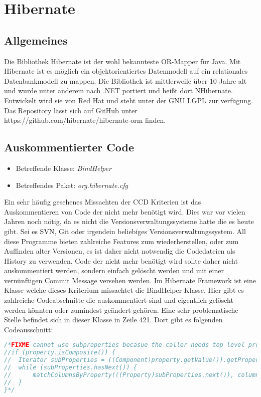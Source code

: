 
\section{Hibernate}
\subsection{Allgemeines}
Die Bibliothek Hibernate ist der wohl bekannteste OR-Mapper für Java. Mit Hibernate ist es möglich ein objektorientiertes Datenmodell  auf ein relationales Datenbankmodell zu mappen. Die Bibliothek ist mittlerweile über 10 Jahre alt und wurde unter anderem nach .NET portiert und heißt dort NHibernate. Entwickelt wird sie von Red Hat und steht unter der GNU LGPL zur verfügung. Das Repository lässt sich auf GitHub unter https://github.com/hibernate/hibernate-orm finden.

\subsection{Auskommentierter Code}
\begin{itemize}
	\item Betreffende Klasse: \textit{BindHelper}
	\item Betreffendes Paket: \textit{org.hibernate.cfg}
\end{itemize}


\SuperPar Ein sehr häufig gesehenes Missachten der CCD Kriterien ist das Auskommentieren von Code der nicht mehr benötigt wird. Dies war vor vielen Jahren noch nötig, da es nicht die Versionsverwaltungssysteme hatte die es heute gibt. Sei es SVN, Git oder irgendein beliebiges Versionsverwaltungssystem. All diese Programme bieten zahlreiche Features zum wiederherstellen, oder zum Auffinden alter Versionen, es ist daher nicht notwendig die Codedateien als History zu verwenden. Code der nicht mehr benötigt wird sollte daher nicht auskommentiert werden, sondern einfach gelöscht werden und mit einer vernünftigen Commit Message versehen werden. Im Hibernate Framework ist eine Klasse welche dieses Kriterium missachtet die BindHelper Klasse. Hier gibt es zahlreiche Codeabschnitte die auskommentiert sind und eigentlich gelöscht werden könnten oder zumindest geändert gehören. Eine sehr problematische Stelle befindet sich in dieser Klasse in Zeile 421. Dort gibt es folgenden Codeausschnitt:

\begin{lstlisting}[language=Java, caption=Beispiele für die Verwendung von \textit{GetByPredicate}, label=lst:GetByPredicate]
/*FIXME cannot use subproperties becasue the caller needs top level properties
//if (property.isComposite()) {
//	Iterator subProperties = ((Component)property.getValue()).getPropertyIterator();
// 	while (subProperties.hasNext()) {
//  	matchColumnsByProperty(((Property)subProperties.next()), columnsToProperty);
// 	}
}*/ 
\end{lstlisting}


